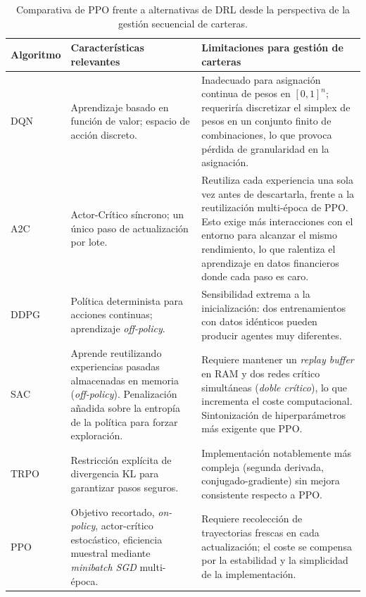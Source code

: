 \documentclass[IB,a4paper]{TFUOC}
\begin{document}
\begin{table}[h]
\centering
\renewcommand{\arraystretch}{1.25}
\begin{tabular}{|p{2.6cm}|p{6.0cm}|p{5.2cm}|}
\hline
\textbf{Algoritmo} & \textbf{Características relevantes} & \textbf{Limitaciones para gestión de carteras} \\ \hline
DQN \citep{mnih2015dqn} & Aprendizaje basado en función de valor; espacio de acción discreto. & Inadecuado para asignación continua de pesos en $[0,1]^{n}$; requeriría discretizar el simplex de pesos en un conjunto finito de combinaciones, lo que provoca pérdida de granularidad en la asignación. \\ \hline
A2C \citep{mnih2016a3c} & Actor-Crítico síncrono; un único paso de actualización por lote. & Reutiliza cada experiencia una sola vez antes de descartarla, frente a la reutilización multi-época de PPO. Esto exige más interacciones con el entorno para alcanzar el mismo rendimiento, lo que ralentiza el aprendizaje en datos financieros donde cada paso es caro. \\ \hline
DDPG \citep{lillicrap2015ddpg} & Política determinista para acciones continuas; aprendizaje \textit{off-policy}. & Sensibilidad extrema a la inicialización: dos entrenamientos con datos idénticos pueden producir agentes muy diferentes. \\ \hline
SAC \citep{haarnoja2018sac} & Aprende reutilizando experiencias pasadas almacenadas en memoria (\textit{off-policy}). Penalización añadida sobre la entropía de la política para forzar exploración. & Requiere mantener un \textit{replay buffer} en RAM y dos redes crítico simultáneas (\textit{doble crítico}), lo que incrementa el coste computacional. Sintonización de hiperparámetros más exigente que PPO. \\ \hline
TRPO \citep{schulman2015trpo} & Restricción explícita de divergencia KL para garantizar pasos seguros. & Implementación notablemente más compleja (segunda derivada, conjugado-gradiente) sin mejora consistente respecto a PPO. \\ \hline
PPO \citep{schulman2017ppo} & Objetivo recortado, \textit{on-policy}, actor-crítico estocástico, eficiencia muestral mediante \textit{minibatch SGD} multi-época. & Requiere recolección de trayectorias frescas en cada actualización; el coste se compensa por la estabilidad y la simplicidad de la implementación. \\ \hline
\end{tabular}
\caption{Comparativa de PPO frente a alternativas de DRL desde la perspectiva de la gestión secuencial de carteras.}
\label{tab:ppo_vs_alternativas}
\end{table}
\end{document}
